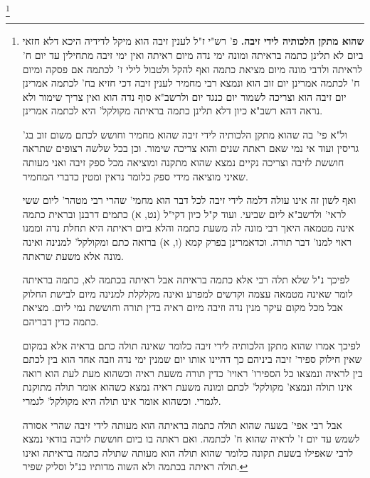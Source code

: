 \documentclass[12pt, openany]{book}
\newcommand{\footnotecomment}[1]{\footnote{#1}}
\newcommand{\commenta}[1]{\footnotecomment{#1}}
\begin{document}
{\commenta{\textbf{שהוא מתקן הלכותיה לידי זיבה.}  פ' רש"י ז"ל לענין זיבה הוא מיקל לדידיה היכא דלא חזאי ביום לא תלינן כתמה בראיתה ומונה ימי נדה מיום ראיתה ואין ימי זיבה מתחילין עד יום ח' לראיתה ולרבי מונה מיום מציאת כתמה ואף להקל ולטבול לילי ז' לכתמה אם פסקה ומיום ח' לכתמה אמרינן יום זוב הוא ונמצא רבי מחמיר לענין זיבה דכי חזיא בח' לכתמה אמרינן יום זיבה הוא וצריכה לשמור יום כנגד יום ולרשב"א סוף נדה הוא ואין צריך שימור ולא נראה דהא רשב"א כיון דלא תלינן כתמה בראיתה מקולקל' היא לכתמה אמרינן.\par  ול"א פי' בה שהוא מתקן הלכותיה לידי זיבה שהוא מחמיר וחושש לכתם משום זוב בג' גריסין ועוד אי נמי שאם ראתה שנים והוא צריכה שימור. וכן בכל שלשה רצופים שתראה חוששת לזיבה וצריכה נקיים נמצא שהוא מתקנה ומוציאה מכל ספק זיבה ואני מעותה שאיני מוציאה מידי ספק כלומר נראין ומטין כדברי המחמיר.\par ואף לשון זה אינו עולה דלמה לידי זיבה לכל דבר הוא מחמי' שהרי רבי מטהר' ליום ששי לראי' ולרשב"א ליום שביעי. ועוד ק"ל כיון דקי"ל (נט, א) כתמים דרבנן ובראית כתמה אינה מטמאה היאך רבי מונה לה משעת כתמה והלא ביום ראיתה היא תחלת נדה וממנו ראוי למנו' דבר תורה. וכדאמרינן בפרק קמא (ו, א) ברואה כתם ומקולקל' למנינה ואינה מונה אלא משעת שראתה.\par  לפיכך נ"ל שלא תלה רבי אלא כתמה בראיתה אבל ראיתה בכתמה לא, כתמה בראיתה לומר שאינה מטמאה עצמה וקדשים למפרע ואינה מקלקלת למנינה מיום לבישת החלוק אבל מכל מקום עיקר מנין נדה וזיבה מיום ראיה בדין תורה וחוששת נמי ליום. מציאת כתמה כדין דבריהם.\par  לפיכך אמרו שהוא מתקן הלכותיה לידי זיבה כלומר שאינה תולה כתם בראיה אלא במקום שאין חילוק ספיר' זיבה ביניהם כך דהיינו אותו יום שמנין ימי נדה וזבה אחד הוא בין לכתם בין לראיה ונמצאו כל הספירו' ראויו' כדין תורה משעת ראיה וכשהוא מעת לעת הוא רואה אינו תולה ונמצא' מקולקל' לכתם ומונה משעת ראיה נמצא כשהוא אומר תולה מתוקנת לגמרי. וכשהוא אומר אינו תולה היא מקולקל' לגמרי.\par  אבל רבי אפי' בשעה שהוא תולה כתמה בראיתה הוא מעותה לידי זיבה שהרי אסורה לשמש עד יום ז' לראיה שהוא ח' לכתמה. ואם ראתה בו ביום חוששת לזיבה בודאי נמצא לרבי שאפילו בשעת תקונה כלומר שהוא תולה הוא מעותה שתולה כתמה בראיתה ואינו תולה ראיתה בכתמה ולא השוה מדותיו כנ"ל וסליק שפיר. }

}
\end{document}

